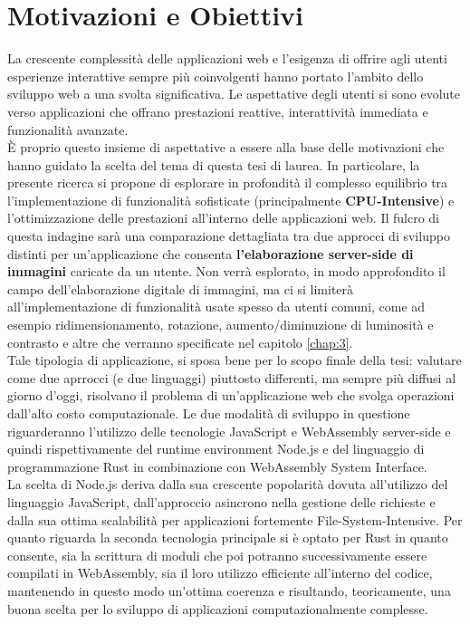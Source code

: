 \section{Motivazioni e Obiettivi}
\label{sec:Obiettivi}
La crescente complessità delle applicazioni web e l'esigenza di offrire agli utenti esperienze interattive sempre più coinvolgenti hanno portato l'ambito dello sviluppo web a una svolta significativa. Le aspettative degli utenti si sono evolute verso applicazioni che offrano prestazioni reattive, interattività immediata e funzionalità avanzate.
\\È proprio questo insieme di aspettative a essere alla base delle motivazioni che hanno guidato la scelta del tema di questa tesi di laurea.
In particolare, la presente ricerca si propone di esplorare in profondità il complesso equilibrio tra l'implementazione di funzionalità sofisticate (principalmente \textbf{CPU-Intensive}) e l'ottimizzazione delle prestazioni all'interno delle applicazioni web. Il fulcro di questa indagine sarà una comparazione dettagliata tra due approcci di sviluppo distinti per un'applicazione che consenta \textbf{l'elaborazione server-side di immagini} caricate da un utente.
Non verrà esplorato, in modo approfondito il campo dell'elaborazione digitale di immagini, ma ci si limiterà all'implementazione di funzionalità usate spesso da utenti comuni, come ad esempio ridimensionamento, rotazione, aumento/diminuzione di luminosità e contrasto e altre che verranno specificate nel capitolo \ref{chap:3}.
\\Tale tipologia di applicazione, si sposa bene per lo scopo finale della tesi: valutare come due aprrocci (e due linguaggi) piuttosto differenti, ma sempre più diffusi al giorno d'oggi, risolvano il problema di un'applicazione web che svolga operazioni dall'alto costo computazionale.
Le due modalità di sviluppo in questione riguarderanno l'utilizzo delle tecnologie JavaScript e WebAssembly server-side e quindi rispettivamente del runtime environment Node.js e del linguaggio di programmazione Rust in combinazione con WebAssembly System Interface. 
\\La scelta di Node.js deriva dalla sua crescente popolarità dovuta all'utilizzo del linguaggio JavaScript, dall'approccio asincrono nella gestione delle richieste e dalla sua ottima scalabilità per applicazioni fortemente File-System-Intensive.
Per quanto riguarda la seconda tecnologia principale si è optato per Rust in quanto consente, sia la scrittura di moduli che poi potranno successivamente essere compilati in WebAssembly, sia il loro utilizzo efficiente all'interno del codice, mantenendo in questo modo un'ottima coerenza e risultando, teoricamente, una buona scelta per lo sviluppo di applicazioni computazionalmente complesse. 
